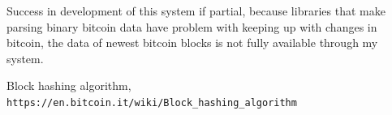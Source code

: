 \documentclass[12pt, en, eng]{mgr}
\begin{document}
Success in development of this system if partial, because libraries that make parsing binary bitcoin data have problem with keeping up with changes in bitcoin, the data of newest bitcoin blocks is not fully available through my system.    
   

\begin{thebibliography}{9}
 
Block hashing algorithm,
\\\texttt{https://en.bitcoin.it/wiki/Block\_hashing\_algorithm}
\end{thebibliography}
\end{document}
